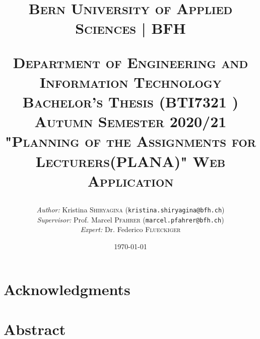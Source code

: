 \documentclass{scrartcl}
\begin{document}
\begin{titlepage}


\title{\textsc{\LARGE Bern University of Applied Sciences | BFH }\\[1cm]
\begin{center}
\end{center}
\textsc{\small Department of Engineering and Information Technology}\\
\textsc{\small Bachelor's Thesis (BTI7321 ) Autumn Semester 2020/21}\\[1cm]
\textsc{"Planning of the Assignments for Lecturers(PLANA)" Web Application}}
\date{\today}   %
\author{\textit{Author: }Kristina \textsc{Shiryagina} (\texttt{kristina.shiryagina@bfh.ch}) \\
 \textit{Supervisor: } Prof. Marcel \textsc{Pfahrer}  (\texttt{marcel.pfahrer@bfh.ch})\\
 \textit{Expert: } Dr. Federico \textsc {Flueckiger}   \\
 }
\maketitle	

\newpage


	
\tableofcontents
\clearpage
\end{titlepage}

\setcounter{secnumdepth}{-2}%





\section{Acknowledgments}


\section{Abstract}


\setcounter{secnumdepth}{2}  %
\end{document}
